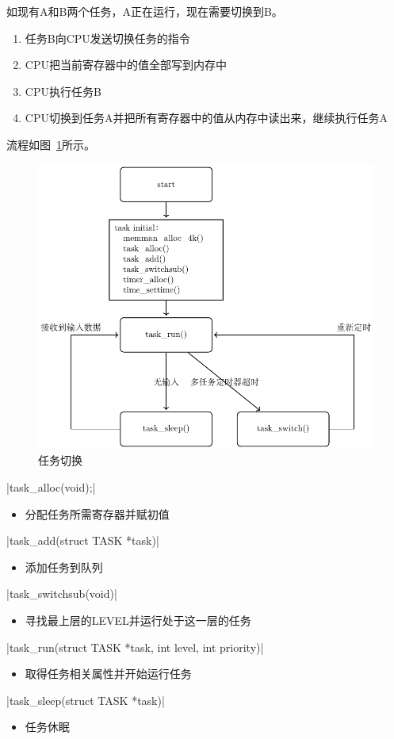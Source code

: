 如现有A和B两个任务，A正在运行，现在需要切换到B。
\begin{enumerate}
	\item 任务B向CPU发送切换任务的指令
	\item CPU把当前寄存器中的值全部写到内存中
	\item CPU执行任务B
	\item CPU切换到任务A并把所有寄存器中的值从内存中读出来，继续执行任务A
\end{enumerate}
流程如图~\ref{fig:tasksw}所示。
\begin{figure}[H]
	\centering
	\includegraphics[width=.7\textwidth]{../Fig/func/multi.pdf}
	\caption{任务切换}
	\label{fig:tasksw}
\end{figure}
\newpage
\csingle|task_alloc(void);|
\begin{itemize}
	\item 分配任务所需寄存器并赋初值
\end{itemize}

\csingle|task_add(struct TASK *task)|
\begin{itemize}
	\item 添加任务到队列
\end{itemize}

\csingle|task_switchsub(void)|
\begin{itemize}
	\item 寻找最上层的LEVEL并运行处于这一层的任务
\end{itemize}

\csingle|task_run(struct TASK *task, int level, int priority)|
\begin{itemize}
	\item 取得任务相关属性并开始运行任务
\end{itemize}

\csingle|task_sleep(struct TASK *task)|
\begin{itemize}
	\item 任务休眠
\end{itemize}


